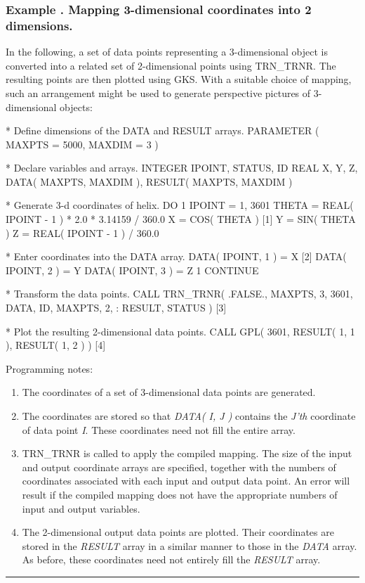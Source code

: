 \documentclass[twoside,nolof,11pt]{starlink}
\providecommand{\name}[1]{\small{#1}}
\providecommand{\fortvar}[1]{\emph{#1}}
\newcounter{examplecounter}
\providecommand{\example}[1]{\addtocounter{examplecounter}{1}
                         \subsubsection*{Example \theexamplecounter. #1}}
\providecommand{\exampledone}[0]{\begin{center} \rule{6em}{0.2mm} \end{center}}
\begin{document}
\example{Mapping 3-dimensional coordinates into 2 dimensions.}
In the following, a set of data points representing a 3-dimensional object
is converted into a related set of 2-dimensional points using
\name{TRN\_TRNR}.
The resulting points are then plotted using \name{GKS}.
With a suitable choice of mapping, such an arrangement might be used to
generate perspective pictures of 3-dimensional objects:

\begin{terminalv}
*  Define dimensions of the DATA and RESULT arrays.
      PARAMETER ( MAXPTS = 5000, MAXDIM = 3 )

*  Declare variables and arrays.
      INTEGER IPOINT, STATUS, ID
      REAL X, Y, Z, DATA( MAXPTS, MAXDIM ), RESULT( MAXPTS, MAXDIM )

*  Generate 3-d coordinates of helix.
      DO 1 IPOINT = 1, 3601
         THETA = REAL( IPOINT - 1 ) * 2.0 * 3.14159 / 360.0
         X = COS( THETA )                              [1]
         Y = SIN( THETA )
         Z = REAL( IPOINT - 1 ) / 360.0

*  Enter coordinates into the DATA array.
         DATA( IPOINT, 1 ) = X                         [2]
         DATA( IPOINT, 2 ) = Y
         DATA( IPOINT, 3 ) = Z
    1 CONTINUE

*  Transform the data points.
      CALL TRN_TRNR( .FALSE., MAXPTS, 3, 3601, DATA, ID, MAXPTS, 2,
     :               RESULT, STATUS )                  [3]

*  Plot the resulting 2-dimensional data points.
      CALL GPL( 3601, RESULT( 1, 1 ), RESULT( 1, 2 ) ) [4]
\end{terminalv}

Programming notes:

\begin{enumerate}

\item The coordinates of a set of 3-dimensional data points are generated.

\item The coordinates are stored so that \fortvar{DATA( I, J )} contains the
\fortvar{J'th} coordinate of data point \fortvar{I}.
These coordinates need not fill the entire array.

\item \name{TRN\_TRNR} is called to apply the compiled mapping.
The size of the input and output coordinate arrays are specified, together
with the numbers of coordinates associated with each input and output data
point.
An error will result if the compiled mapping does not have the appropriate
numbers of input and output variables.

\item The 2-dimensional output data points are plotted.
Their coordinates are stored in the \fortvar{RESULT} array in a similar
manner to those in the \fortvar{DATA} array.
As before, these coordinates need not entirely fill the \fortvar{RESULT}
array.

\end{enumerate}
\exampledone
\end{document}
